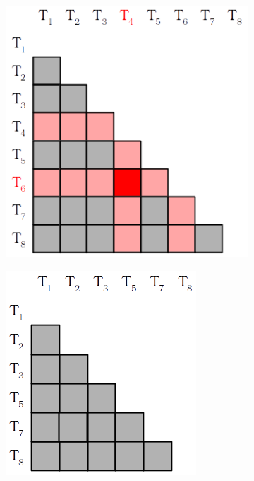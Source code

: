 \documentclass[12pt,a4paper]{article}
\begin{document}
\begin{figure}[H]
	\begin{subfigure}[t]{0.33\linewidth}
		\centering
		\includegraphics[width=0.8\linewidth]{img/matrix1.png}
		\caption{}
		\label{sub:matrix1}
	\end{subfigure}
	\begin{subfigure}[t]{0.33\linewidth}
		\centering
		\includegraphics[width=0.6\linewidth]{img/matrix2.png}
		\caption{}
		\label{sub:matrix2}	
	\end{subfigure}
	\begin{subfigure}[t]{0.33\linewidth}
		\centering

\end{subfigure}
\end{figure}
\end{document}
